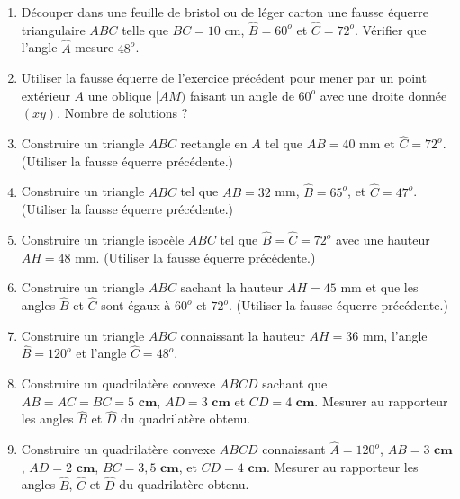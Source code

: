 \documentclass[12 pt]{report}
\theoremstyle{plain}
\newcounter{n}
\newcommand{\cm}{\textbf{ cm}}
\begin{document}
\begin{enumerate}
\item Découper dans une feuille de bristol ou de léger carton une fausse équerre triangulaire $ABC$ telle que $BC=10$ cm, $\widehat{B}=60^o$ et $\widehat{C}=72^o$. 
Vérifier que l'angle $\widehat{A}$ mesure $48^o$.
\item Utiliser la fausse équerre de l'exercice précédent pour mener par un point extérieur $A$ une oblique $[AM)$ faisant un angle de $60^o$ avec une droite donnée $(xy)$. Nombre de solutions ?
\item Construire un triangle $ABC$ rectangle en $A$ tel que $AB=40$ mm et $\widehat{C}= 72^o$. (Utiliser la fausse équerre précédente.)
\item Construire un triangle $ABC$ tel que $AB= 32$ mm, $\widehat{B}= 65^o$, et $\widehat{C}= 47^o$. (Utiliser la fausse équerre précédente.)
\item Construire un triangle isocèle $ABC$ tel que $\widehat{B}= \widehat{C}= 72^o$ avec une hauteur $AH=48$ mm. (Utiliser la fausse équerre précédente.)
\item Construire un triangle $ABC$ sachant la hauteur $AH=45$ mm et que les angles $\widehat{B}$ et $\widehat{C}$ sont égaux à $60^o$ et $72^o$. (Utiliser la fausse équerre précédente.)
\item Construire un triangle $ABC$ connaissant la hauteur $AH= 36$ mm, l'angle $\widehat{B}=120^o$ et l'angle $\widehat{C}= 48^o$. 
\item Construire un quadrilatère convexe $ABCD$ sachant que $AB=AC= BC=5\cm$, $AD=3\cm$ et $CD=4\cm$. Mesurer au rapporteur les angles $\widehat{B}$ et $\widehat{D}$ du quadrilatère obtenu.
\item Construire un quadrilatère convexe $ABCD$ connaissant $\widehat{A}=120^o$, $AB=3\cm$, $AD=2\cm$, $BC=3,5\cm$, et $CD=4\cm$. Mesurer au rapporteur les angles
$\widehat{B}$, $\widehat{C}$ et $\widehat{D}$ du quadrilatère obtenu.
\end{enumerate}
\end{document}
